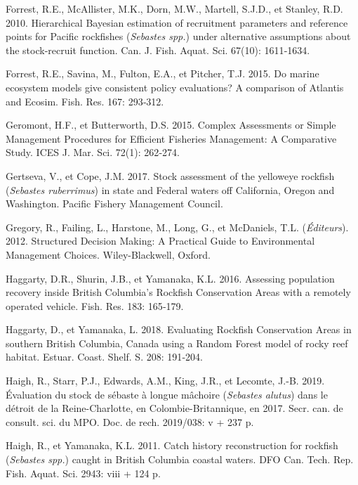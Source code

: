 \documentclass[french,11pt]{book}
\begin{document}
\leavevmode\hypertarget{ref-forrest2010}{}%
Forrest, R.E., McAllister, M.K., Dorn, M.W., Martell, S.J.D., et Stanley, R.D. 2010. Hierarchical Bayesian estimation of recruitment parameters and reference points for Pacific rockfishes (\emph{Sebastes spp.}) under alternative assumptions about the stock-recruit function. Can. J. Fish. Aquat. Sci. 67(10): 1611‑1634.

\leavevmode\hypertarget{ref-forrest2015}{}%
Forrest, R.E., Savina, M., Fulton, E.A., et Pitcher, T.J. 2015. Do marine ecosystem models give consistent policy evaluations? A comparison of Atlantis and Ecosim. Fish. Res. 167: 293‑312.

\leavevmode\hypertarget{ref-geromont2015}{}%
Geromont, H.F., et Butterworth, D.S. 2015. Complex Assessments or Simple Management Procedures for Efficient Fisheries Management: A Comparative Study. ICES J. Mar. Sci. 72(1): 262‑274.

\leavevmode\hypertarget{ref-gertseva2017}{}%
Gertseva, V., et Cope, J.M. 2017. Stock assessment of the yelloweye rockfish (\emph{Sebastes ruberrimus}) in state and Federal waters off California, Oregon and Washington. Pacific Fishery Management Council.

\leavevmode\hypertarget{ref-gregory2012}{}%
Gregory, R., Failing, L., Harstone, M., Long, G., et McDaniels, T.L. (\emph{Éditeurs}). 2012. Structured Decision Making: A Practical Guide to Environmental Management Choices. Wiley-Blackwell, Oxford.

\leavevmode\hypertarget{ref-haggarty2016b}{}%
Haggarty, D.R., Shurin, J.B., et Yamanaka, K.L. 2016. Assessing population recovery inside British Columbia's Rockfish Conservation Areas with a remotely operated vehicle. Fish. Res. 183: 165‑179.

\leavevmode\hypertarget{ref-haggarty2018}{}%
Haggarty, D., et Yamanaka, L. 2018. Evaluating Rockfish Conservation Areas in southern British Columbia, Canada using a Random Forest model of rocky reef habitat. Estuar. Coast. Shelf. S. 208: 191‑204.

\leavevmode\hypertarget{ref-haigh2019}{}%
Haigh, R., Starr, P.J., Edwards, A.M., King, J.R., et Lecomte, J.-B. 2019. Évaluation du stock de sébaste à longue mâchoire (\emph{Sebastes alutus}) dans le détroit de la Reine-Charlotte, en Colombie-Britannique, en 2017. Secr. can. de consult. sci. du MPO. Doc. de rech. 2019/038: v + 237 p.

\leavevmode\hypertarget{ref-haigh2011}{}%
Haigh, R., et Yamanaka, K.L. 2011. Catch history reconstruction for rockfish (\emph{Sebastes spp.}) caught in British Columbia coastal waters. DFO Can. Tech. Rep. Fish. Aquat. Sci. 2943: viii + 124 p.
\end{document}
